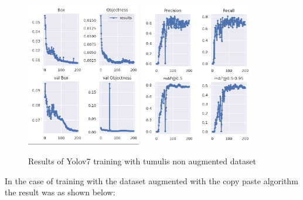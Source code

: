 \begin{figure}[H]
    \centering
    {{\includegraphics[width=5cm]{images/training/mamoas/notaug1.png} }}
    \qquad
    {{\includegraphics[width=5cm]{images/training/mamoas/notaug2.png} }}
    \caption{Results of Yolov7 training with tumulis non augmented dataset}
    \label{fig:example}
\end{figure}

In the case of training with the dataset augmented with the copy paste algorithm the result was as shown below:

